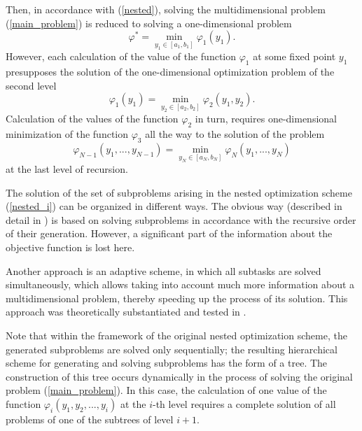 \documentclass[entropy,article,submit,moreauthors,pdftex]{Definitions/mdpi}
\begin{document}
Then, in accordance with  (\ref{nested}), solving the multidimensional problem  (\ref{main_problem}) is reduced to solving a one-dimensional problem 
\begin{equation}\label{nested_1}
\varphi^* = \min_{y_1\in\left[a_1,b_1\right]}\varphi_1(y_1).
\end{equation}
However, each calculation of the value of the function $\varphi_1$ at some fixed point $y_1$ presupposes the solution of the one-dimensional optimization problem of the second level
\begin{equation}
\varphi_1(y_1) = \min_{y_2\in\left[a_2,b_2\right]}\varphi_2(y_1,y_2).
\end{equation}
Calculation of the values of the function  $\varphi_2$ in turn, requires one-dimensional minimization of the function  $\varphi_3$ all the way to the solution of the problem
\begin{equation}
\varphi_{N-1}(y_1,...,y_{N-1}) = \min_{ y_{N} \in\left[a_{N},b_{N}\right]} \varphi_{N}(y_1,...,y_{N})
\end{equation}
at the last level of recursion.

The solution of the set of subproblems arising in the nested optimization scheme  (\ref{nested_i}) can be organized in different ways. 
The obvious way (described in detail in \cite{Grishagin2001,Grishagin2015}) is based on solving subproblems in accordance with the recursive order of their generation. However, a significant part of the information about the objective function is lost here.

Another approach is an adaptive scheme, in which all subtasks are solved simultaneously, which allows taking into account much more information about a multidimensional problem, thereby speeding up the process of its solution. 
This approach was theoretically substantiated and tested in  \cite{Grishagin2016,Grishagin2016_1,Grishagin2018}. 

Note that within the framework of the original nested optimization scheme, the generated subproblems are solved only sequentially; the resulting hierarchical scheme for generating and solving subproblems has the form of a tree. The construction of this tree occurs dynamically in the process of solving the original problem (\ref{main_problem}). In this case, the calculation of one value of the function $\varphi_i(y_1,y_2,...,y_i)$ at the $i$-th level requires a complete solution of all problems of one of the subtrees of level  $i+1$.
\end{document}
